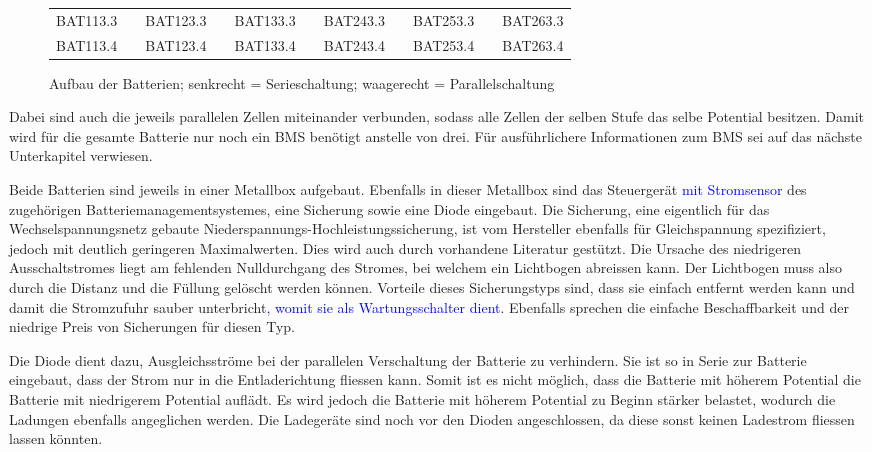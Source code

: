 \begin{figure}[h]
\begin{tabular}{lp{2mm}lp{2mm}lp{1.5cm}lp{2mm}lp{2mm}l}
\multicolumn{1}{|l|}{BAT113.3} & \multicolumn{1}{l|}{} & \multicolumn{1}{l|}{BAT123.3} & \multicolumn{1}{l|}{} & \multicolumn{1}{l|}{BAT133.3} & \multicolumn{1}{l|}{} & \multicolumn{1}{l|}{BAT243.3} & \multicolumn{1}{l|}{} & \multicolumn{1}{l|}{BAT253.3} & \multicolumn{1}{l|}{} & \multicolumn{1}{l|}{BAT263.3} \\ \cline{1-1} \cline{3-3} \cline{5-5} \cline{7-7} \cline{9-9} \cline{11-11} 
\multicolumn{1}{|l|}{BAT113.4} & \multicolumn{1}{l|}{} & \multicolumn{1}{l|}{BAT123.4} & \multicolumn{1}{l|}{} & \multicolumn{1}{l|}{BAT133.4} & \multicolumn{1}{l|}{} & \multicolumn{1}{l|}{BAT243.4} & \multicolumn{1}{l|}{} & \multicolumn{1}{l|}{BAT253.4} & \multicolumn{1}{l|}{} & \multicolumn{1}{l|}{BAT263.4} \\ \cline{1-1} \cline{3-3} \cline{5-5} \cline{7-7} \cline{9-9} \cline{11-11} 
\end{tabular}
	\caption{Aufbau der Batterien; senkrecht = Serieschaltung; waagerecht = Parallelschaltung}
	\label{fig:schema_batterie}
\end{figure}

Dabei sind auch die jeweils parallelen Zellen miteinander verbunden, sodass alle Zellen der selben Stufe das selbe Potential besitzen. Damit wird für die gesamte Batterie nur noch ein BMS benötigt anstelle von drei. Für ausführlichere Informationen zum BMS sei auf das nächste Unterkapitel verwiesen.

Beide Batterien sind jeweils in einer Metallbox aufgebaut. Ebenfalls in dieser Metallbox sind das Steuergerät \textcolor{blue}{mit Stromsensor} des zugehörigen Batteriemanagementsystemes, eine Sicherung sowie eine Diode eingebaut. Die Sicherung, eine eigentlich für das Wechselspannungsnetz gebaute Niederspannungs-Hochleistungssicherung, ist vom Hersteller ebenfalls für Gleichspannung spezifiziert, jedoch mit deutlich geringeren Maximalwerten. Dies wird auch durch vorhandene Literatur \cite{siba} gestützt. Die Ursache des niedrigeren Ausschaltstromes liegt am fehlenden Nulldurchgang des Stromes, bei welchem ein Lichtbogen abreissen kann. Der Lichtbogen muss also durch die Distanz und die Füllung gelöscht werden können. Vorteile dieses Sicherungstyps sind, dass sie einfach entfernt werden kann und damit die Stromzufuhr sauber unterbricht\textcolor{blue}{, womit sie als Wartungsschalter dient}. Ebenfalls sprechen die einfache Beschaffbarkeit und der niedrige Preis von Sicherungen für diesen Typ.

Die Diode dient dazu, Ausgleichsströme bei der parallelen Verschaltung der Batterie zu verhindern. Sie ist so in Serie zur Batterie eingebaut, dass der Strom nur in die Entladerichtung fliessen kann. Somit ist es nicht möglich, dass die Batterie mit höherem Potential die Batterie mit niedrigerem Potential auflädt. Es wird jedoch die Batterie mit höherem Potential zu Beginn stärker belastet, wodurch die Ladungen ebenfalls angeglichen werden. Die Ladegeräte sind noch vor den Dioden angeschlossen, da diese sonst keinen Ladestrom fliessen lassen könnten.

